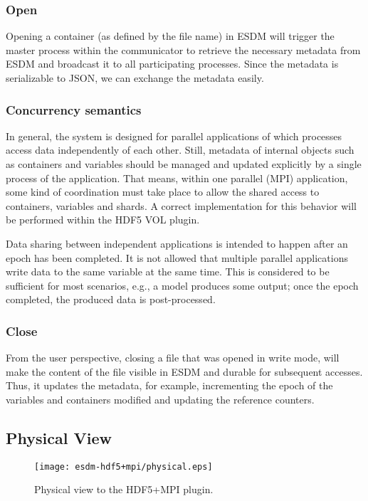 \subsubsection{Open}

Opening a container (as defined by the file name) in ESDM will trigger the master process within the communicator to retrieve the necessary metadata from ESDM and broadcast it to all participating processes.
Since the metadata is serializable to JSON, we can exchange the metadata easily.

\subsubsection{Concurrency semantics}

In general, the system is designed for parallel applications of which processes access data independently of each other.
Still, metadata of internal objects such as containers and variables should be managed and updated explicitly by a single process of the application.
That means, within one parallel (MPI) application, some kind of coordination must take place to allow the shared access to containers, variables and shards.
A correct implementation for this behavior will be performed within the HDF5 VOL plugin.

Data sharing between independent applications is intended to happen after an epoch has been completed.
It is not allowed that multiple parallel applications write data to the same variable at the same time.
This is considered to be sufficient for most scenarios, e.g., a model produces some output; once the epoch  completed, the produced data is post-processed.

\subsubsection{Close}

From the user perspective, closing a file that was opened in write mode, will make the content of the file visible in ESDM and durable for subsequent accesses.
Thus, it updates the metadata, for example, incrementing the epoch of the variables and containers modified and updating the reference counters.

\subsection{Physical View}


\begin{figure}
	\centering
	\texttt{[image: esdm-hdf5+mpi/physical.eps]}
	\caption{Physical view to the HDF5+MPI plugin.}
	\label{fig:esdm hdf5 physical view}
\end{figure}

